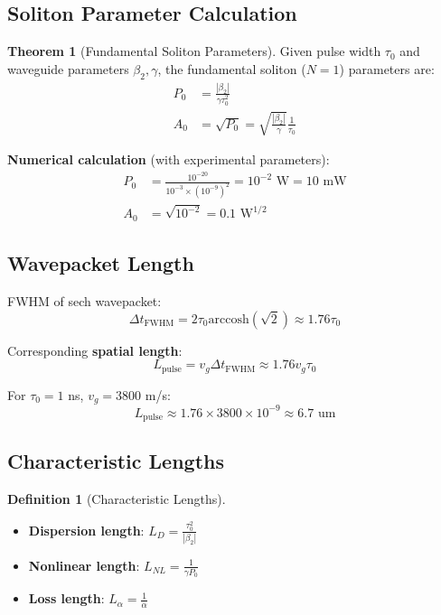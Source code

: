 \documentclass[12pt,a4paper]{article}
\theoremstyle{definition}
\newtheorem{definition}{Definition}[section]
\newtheorem{theorem}{Theorem}[section]
\begin{document}
\subsection{Soliton Parameter Calculation}

\begin{theorem}[Fundamental Soliton Parameters]
Given pulse width $\tau_0$ and waveguide parameters $\beta_2,\gamma$, the fundamental soliton ($N=1$) parameters are:
\begin{align}
P_0 &= \frac{|\beta_2|}{\gamma\tau_0^2} \\
A_0 &= \sqrt{P_0} = \sqrt{\frac{|\beta_2|}{\gamma}}\frac{1}{\tau_0}
\end{align}
\end{theorem}

\textbf{Numerical calculation} (with experimental parameters):
\begin{align}
P_0 &= \frac{10^{-20}}{10^{-3}\times(10^{-9})^2} = 10^{-2}\text{ W} = 10\text{ mW} \\
A_0 &= \sqrt{10^{-2}} = 0.1\text{ W}^{1/2}
\end{align}

\subsection{Wavepacket Length}

FWHM of sech wavepacket:
\begin{equation}
\Delta t_{\text{FWHM}} = 2\tau_0\text{arccosh}(\sqrt{2}) \approx 1.76\tau_0
\end{equation}

Corresponding \textbf{spatial length}:
\begin{equation}
\boxed{L_{\text{pulse}} = v_g\Delta t_{\text{FWHM}} \approx 1.76v_g\tau_0}
\end{equation}

For $\tau_0 = 1$ ns, $v_g = 3800$ m/s:
\begin{equation}
L_{\text{pulse}} \approx 1.76\times3800\times10^{-9} \approx 6.7\text{ um}
\end{equation}

\subsection{Characteristic Lengths}

\begin{definition}[Characteristic Lengths]
\begin{itemize}
\item \textbf{Dispersion length}: $L_D = \frac{\tau_0^2}{|\beta_2|}$
\item \textbf{Nonlinear length}: $L_{NL} = \frac{1}{\gamma P_0}$
\item \textbf{Loss length}: $L_{\alpha} = \frac{1}{\alpha}$
\end{itemize}
\end{definition}
\end{document}
